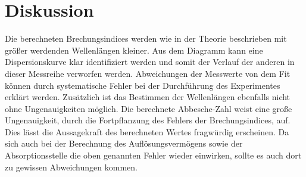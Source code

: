 \section{Diskussion}
\label{sec:Diskussion}

Die berechneten Brechungsindices werden wie in der Theorie beschrieben mit größer werdenden Wellenlängen kleiner.
Aus dem Diagramm kann eine Dispersionskurve klar identifiziert werden und somit der Verlauf der anderen in dieser
Messreihe verworfen werden. Abweichungen der Messwerte von dem Fit können durch systematische Fehler bei der Durchführung des
Experimentes erklärt werden. Zusätzlich ist das Bestimmen der Wellenlängen ebenfalls nicht ohne Ungenauigkeiten möglich.
Die berechnete Abbesche-Zahl weist eine große Ungenauigkeit, durch die Fortpflanzung des Fehlers der Brechungsindices, auf. Dies lässt die
Aussagekraft des berechneten Wertes fragwürdig erscheinen.
Da sich auch bei der Berechnung des Auflösungsvermögens sowie der Absorptionsstelle die oben genannten Fehler wieder einwirken, sollte es
auch dort zu gewissen Abweichungen kommen.
